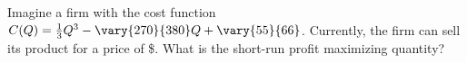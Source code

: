 \begin{question}[type=exam]{10}
  Imagine a firm with the cost function 
  $C(Q) = \frac{1}{3} Q^3 - \vary{270}{380}Q + \vary{55}{66}$. 
  Currently, the firm can sell its product for a price of \$.
  What is the short-run profit maximizing quantity? 
\end{question}

